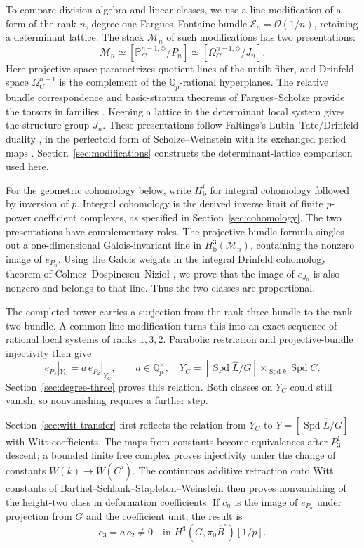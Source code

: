 \documentclass[11pt]{article}
\numberwithin{equation}{section}
\theoremstyle{definition}
\theoremstyle{remark}
\newcommand{\Q}{\mathbb Q}
\newcommand{\cO}{\mathcal O}
\DeclareMathOperator{\Spd}{Spd}
\begin{document}
To compare division-algebra and linear classes, we use a line
modification of a form of the rank-\(n\), degree-one Fargues--Fontaine
bundle \(\mathcal E_n^0=\cO(1/n)\), retaining a determinant lattice.
The stack \(\mathcal M_n\) of such modifications has two presentations:
\[
 \mathcal M_n\simeq[\mathbb P_C^{n-1,\diamondsuit}/P_n]
       \simeq[\Omega_C^{n-1,\diamondsuit}/J_n].
\]
Here projective space parametrizes quotient lines of the untilt fiber,
and Drinfeld space \(\Omega_C^{n-1}\) is the complement of the
\(\Q_p\)-rational hyperplanes. The relative bundle correspondence and
basic-stratum theorems of Fargues--Scholze provide the torsors in
families \cite[Theorem~II.2.19, Corollary~II.2.20, and
Theorems~III.2.4 and~III.4.5]{FS}. Keeping a lattice in the determinant
local system gives the structure group \(J_n\). These presentations
follow Faltings's Lubin--Tate/Drinfeld duality
\cite[Introduction]{Faltings2002}, in the perfectoid form of
Scholze--Weinstein with its exchanged period maps
\cite[Theorem~7.2.3]{SW2013}. Section~\ref{sec:modifications}
constructs the determinant-lattice comparison used here.

For the geometric cohomology below, write \(H^i_{\mathrm b}\) for
integral cohomology followed by inversion of \(p\). Integral cohomology
is the derived inverse limit of finite \(p\)-power coefficient complexes,
as specified in Section~\ref{sec:cohomology}.
The two presentations have complementary roles. The projective bundle
formula singles out a one-dimensional Galois-invariant line in
\(H^3_{\mathrm b}(\mathcal M_n)\), containing the nonzero image of \(e_{P_n}\).
Using the Galois weights in the integral Drinfeld cohomology theorem
of Colmez--Dospinescu--Nizioł \cite[Theorems~1.1 and~5.1]{CDN2021},
we prove that the image of \(e_{J_n}\) is also nonzero and belongs
to that line. Thus the two
classes are proportional.

The completed tower carries a surjection from the rank-three bundle
to the rank-two bundle. A common line modification turns this into
an exact sequence of rational local systems of ranks \(1,3,2\).
Parabolic restriction and projective-bundle injectivity then give
\[
 e_{P_3}|_{Y_C}=a\,e_{P_2}|_{Y_C},\qquad a\in\Q_p^\times,
 \quad
 Y_C=[\Spd\widehat L/G]\times_{\Spd k}\Spd C.
\]
Section~\ref{sec:degree-three} proves this relation. Both classes on
\(Y_C\) could still vanish, so nonvanishing requires a further step.

Section~\ref{sec:witt-transfer} first reflects the relation from
\(Y_C\) to \(Y=[\Spd\widehat L/G]\) with Witt coefficients. The
maps from constants become equivalences after \(P_3^1\)-descent;
a bounded finite free complex proves injectivity under the change
of constants \(W(k)\to W(C^\flat)\). The continuous additive
retraction onto Witt constants of Barthel--Schlank--Stapleton--Weinstein
\cite[Proposition~2.5.1 and Corollary~2.5.9]{BSSW2025} then proves
nonvanishing of the height-two class in deformation coefficients.
If \(c_n\) is the image of \(e_{P_n}\) under projection from \(G\)
and the coefficient unit, the result is
\[
 c_3=a\,c_2\ne0
 \quad\text{in }H^3(G,\pi_0\widehat B^\square)[1/p].
\]
\end{document}
